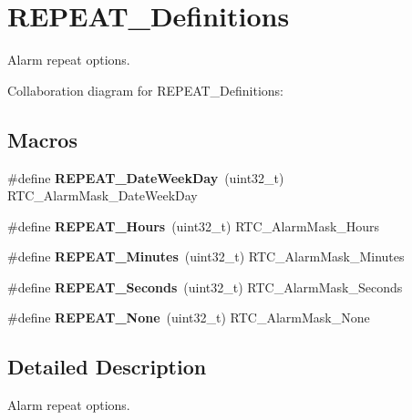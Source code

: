 \hypertarget{group___r_e_p_e_a_t___definitions}{}\section{R\+E\+P\+E\+A\+T\+\_\+\+Definitions}
\label{group___r_e_p_e_a_t___definitions}


Alarm repeat options.  


Collaboration diagram for R\+E\+P\+E\+A\+T\+\_\+\+Definitions\+:
\subsection*{Macros}
\begin{DoxyCompactItemize}
\item 
\mbox{\label{group___r_e_p_e_a_t___definitions_ga9f2fcc8488db26c77b5ffd8f6c10c5d0}} 
\#define {\bfseries R\+E\+P\+E\+A\+T\+\_\+\+Date\+Week\+Day}~(uint32\+\_\+t) R\+T\+C\+\_\+\+Alarm\+Mask\+\_\+\+Date\+Week\+Day
\item 
\mbox{\label{group___r_e_p_e_a_t___definitions_gaa31a39c1b2a1d619db0901cc7c8d4592}} 
\#define {\bfseries R\+E\+P\+E\+A\+T\+\_\+\+Hours}~(uint32\+\_\+t) R\+T\+C\+\_\+\+Alarm\+Mask\+\_\+\+Hours
\item 
\mbox{\label{group___r_e_p_e_a_t___definitions_gac80fc7d65b83128ca58e210922020d37}} 
\#define {\bfseries R\+E\+P\+E\+A\+T\+\_\+\+Minutes}~(uint32\+\_\+t) R\+T\+C\+\_\+\+Alarm\+Mask\+\_\+\+Minutes
\item 
\mbox{\label{group___r_e_p_e_a_t___definitions_ga12d07c13f393b5b12efad9cd892de472}} 
\#define {\bfseries R\+E\+P\+E\+A\+T\+\_\+\+Seconds}~(uint32\+\_\+t) R\+T\+C\+\_\+\+Alarm\+Mask\+\_\+\+Seconds
\item 
\mbox{\label{group___r_e_p_e_a_t___definitions_ga473d162f72a4680e7e14043dfaf092c0}} 
\#define {\bfseries R\+E\+P\+E\+A\+T\+\_\+\+None}~(uint32\+\_\+t) R\+T\+C\+\_\+\+Alarm\+Mask\+\_\+\+None
\end{DoxyCompactItemize}


\subsection{Detailed Description}
Alarm repeat options. 

